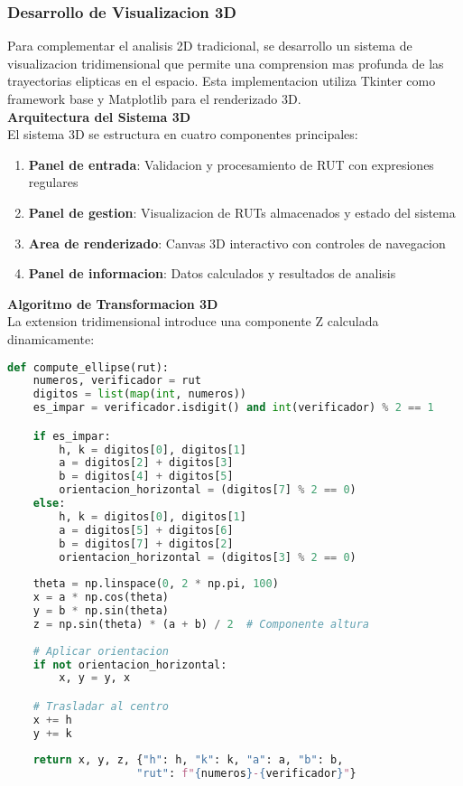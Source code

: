 \documentclass[12pt,a4paper]{article}
\begin{document}
\subsubsection{Desarrollo de Visualizacion 3D}

Para complementar el analisis 2D tradicional, se desarrollo un sistema de visualizacion tridimensional que permite una comprension mas profunda de las trayectorias elipticas en el espacio. Esta implementacion utiliza Tkinter como framework base y Matplotlib para el renderizado 3D.\\

\textbf{Arquitectura del Sistema 3D}\\

El sistema 3D se estructura en cuatro componentes principales:

\begin{enumerate}
    \item \textbf{Panel de entrada}: Validacion y procesamiento de RUT con expresiones regulares
    \item \textbf{Panel de gestion}: Visualizacion de RUTs almacenados y estado del sistema
    \item \textbf{Area de renderizado}: Canvas 3D interactivo con controles de navegacion
    \item \textbf{Panel de informacion}: Datos calculados y resultados de analisis
\end{enumerate}

\textbf{Algoritmo de Transformacion 3D}\\

La extension tridimensional introduce una componente Z calculada dinamicamente:

\begin{lstlisting}[language=Python, caption=Generacion de elipses 3D]
def compute_ellipse(rut):
    numeros, verificador = rut
    digitos = list(map(int, numeros))
    es_impar = verificador.isdigit() and int(verificador) % 2 == 1

    if es_impar:
        h, k = digitos[0], digitos[1]
        a = digitos[2] + digitos[3]
        b = digitos[4] + digitos[5]
        orientacion_horizontal = (digitos[7] % 2 == 0)
    else:
        h, k = digitos[0], digitos[1]
        a = digitos[5] + digitos[6]
        b = digitos[7] + digitos[2]
        orientacion_horizontal = (digitos[3] % 2 == 0)
    
    theta = np.linspace(0, 2 * np.pi, 100)
    x = a * np.cos(theta)
    y = b * np.sin(theta)
    z = np.sin(theta) * (a + b) / 2  # Componente altura
    
    # Aplicar orientacion
    if not orientacion_horizontal:
        x, y = y, x

    # Trasladar al centro
    x += h
    y += k
    
    return x, y, z, {"h": h, "k": k, "a": a, "b": b, 
                    "rut": f"{numeros}-{verificador}"}
\end{lstlisting}
\end{document}
